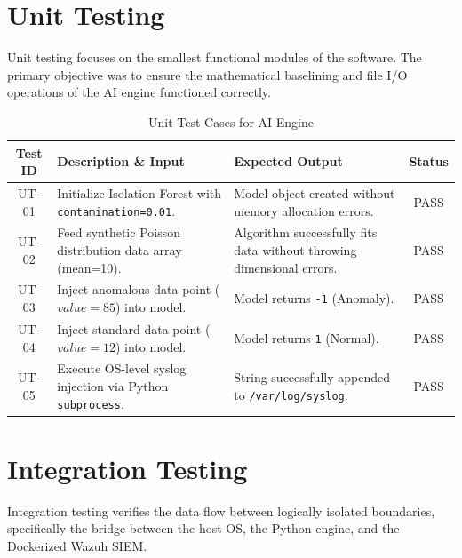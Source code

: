 \documentclass[12pt, a4paper]{report}
\begin{document}
	\section{Unit Testing}
	Unit testing focuses on the smallest functional modules of the software. The primary objective was to ensure the mathematical baselining and file I/O operations of the AI engine functioned correctly.
	
	\begin{table}[H]
		\centering
		\caption{Unit Test Cases for AI Engine}
		\vspace{0.2cm}
		\begin{tabularx}{\textwidth}{|c|X|X|c|}
			\hline
			\textbf{Test ID} & \textbf{Description \& Input} & \textbf{Expected Output} & \textbf{Status} \\
			\hline
			UT-01 & Initialize Isolation Forest with \texttt{contamination=0.01}. & Model object created without memory allocation errors. & PASS \\
			\hline
			UT-02 & Feed synthetic Poisson distribution data array (mean=10). & Algorithm successfully fits data without throwing dimensional errors. & PASS \\
			\hline
			UT-03 & Inject anomalous data point ($value=85$) into model. & Model returns \texttt{-1} (Anomaly). & PASS \\
			\hline
			UT-04 & Inject standard data point ($value=12$) into model. & Model returns \texttt{1} (Normal). & PASS \\
			\hline
			UT-05 & Execute OS-level syslog injection via Python \texttt{subprocess}. & String successfully appended to \texttt{/var/log/syslog}. & PASS \\
			\hline
		\end{tabularx}
	\end{table}
	
	\section{Integration Testing}
	Integration testing verifies the data flow between logically isolated boundaries, specifically the bridge between the host OS, the Python engine, and the Dockerized Wazuh SIEM.
	
\end{document}
